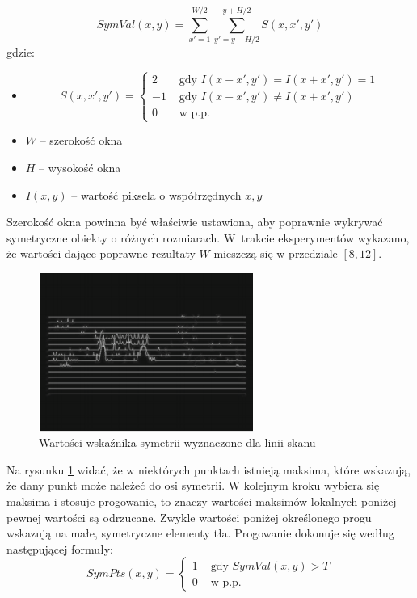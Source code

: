 \begin{equation}
\label{eq:sym_detect}
SymVal(x,y)=\sum_{x'=1}^{W/2}\sum_{y'=y-H/2}^{y+H/2}S(x, x', y')
\end{equation}
gdzie:
\begin{itemize}
\item
\begin{equation}
S(x,x',y')=\begin{cases}
2 & \text{ gdy } I(x-x',y')=I(x+x',y')=1 \\ 
-1 & \text{ gdy } I(x-x',y')\neq I(x+x',y') \\ 
0 & \text{ w p.p. }
\end{cases}
\end{equation}
\item $W$ -- szerokość okna
\item $H$ -- wysokość okna
\item $I(x,y)$ -- wartość piksela o współrzędnych $x,y$
\end{itemize}

Szerokość okna powinna być właściwie ustawiona, aby poprawnie wykrywać symetryczne obiekty o różnych rozmiarach. 
W~trakcie eksperymentów wykazano, że wartości dające poprawne rezultaty $W$ mieszczą się w przedziale $[8,12]$. %

\begin{figure}
  \centering
  \includegraphics[width=7cm]{img/tl_peaks.png}
  \caption{Wartości wskaźnika symetrii wyznaczone dla linii skanu\cite{T1}}
  \label{fig:car_scan_lines}
\end{figure}

Na rysunku \ref{fig:car_scan_lines} widać, że w niektórych punktach istnieją maksima, które wskazują, że dany punkt może należeć do osi symetrii. 
W kolejnym kroku wybiera się maksima i stosuje progowanie, to znaczy wartości maksimów lokalnych poniżej pewnej wartości są odrzucane. %
Zwykle wartości poniżej określonego progu wskazują na małe, symetryczne elementy tła. 
Progowanie dokonuje się według następującej formuły:
\begin{equation}
SymPts(x,y)=\begin{cases}
1 & \text{ gdy } SymVal(x,y)>T\\ 
0 & \text{ w p.p.}
\end{cases}
\end{equation}

